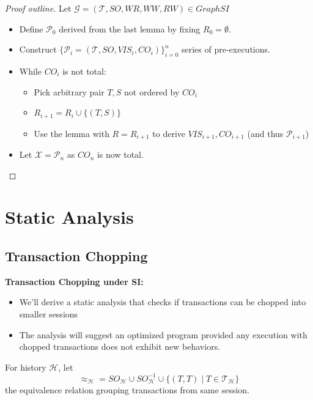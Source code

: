 \documentclass{beamer}
\begin{document}
\begin{frame}
	\begin{proof}[Proof outline]
		Let $\mathcal{G} = (\mathcal{T}, SO, WR, WW, RW) \in GraphSI$
		\begin{itemize}
			\item Define $\mathcal{P}_0$ derived from the last lemma by fixing $R_0 = \emptyset$.
			\item Construct $\{\mathcal{P}_i = (\mathcal{T}, SO, VIS_i, CO_i)\}^n_{i=0}$ series of pre-executions.
			\item While $CO_i$ is not total:
			\begin{itemize}
				\item Pick arbitrary pair $T,S$ not ordered by $CO_i$
				\item $R_{i+1} = R_i \cup \{(T,S)\}$
				\item Use the lemma with $R = R_{i+1}$ to derive $VIS_{i+1}, CO_{i+1}$ (and thus $\mathcal{P}_{i+1}$)
			\end{itemize}
			\item Let $\mathcal{X} = \mathcal{P}_n$ as $CO_n$ is now total.	
		\end{itemize}
	\end{proof}
\end{frame}

\section{Static Analysis}
\subsection{Transaction Chopping}

\begin{frame}
	\textbf{Transaction Chopping under SI:}
	\begin{itemize}
		\item We'll derive a static analysis that checks if transactions can be chopped into smaller sessions
		\item The analysis will suggest an optimized program provided any execution with chopped transactions does not exhibit new behaviors.
	\end{itemize}
\end{frame}


\begin{frame}
	\begin{definition}
		For history $\mathcal{H}$, let
		$$ \approx_\mathcal{H} = SO_\mathcal{H} \cup SO^{-1}_\mathcal{H} \cup \{ (T,T) \mid T \in \mathcal{T}_\mathcal{H}\}$$
		the equivalence relation grouping transactions from same session.
	\end{definition}
\end{frame}
\end{document}
